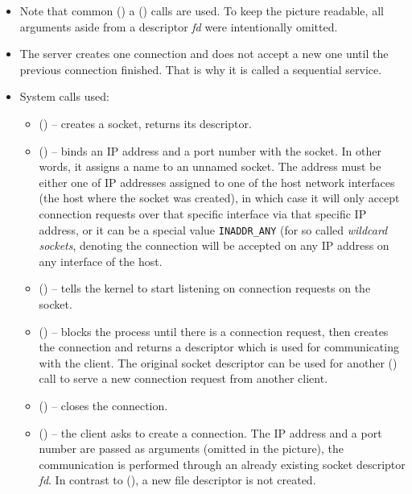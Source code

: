 
\begin{slide}

\end{slide}

\begin{itemize}
\item Note that common () a () calls are used.  To
keep the picture readable, all arguments aside from a descriptor \emph{fd} were
intentionally omitted.
\item The server creates one connection and does not accept a new one until the
previous connection finished.  That is why it is called a sequential service.
\item System calls used:
\begin{itemize}
\item {}() -- creates a socket, returns its descriptor.

\item {}() -- binds an IP address and a port number with the socket.
In other words, it assigns a name to an unnamed socket.  The address must be
either one of IP addresses assigned to one of the host network interfaces (the
host where the socket was created), in which case it will only accept connection
requests over that specific interface via that specific IP address, or it can be
a special value \texttt{INADDR\_ANY} (for so called \emph{wildcard sockets},
denoting the connection will be accepted on any IP address on any interface of
the host.
\item {}() -- tells the kernel to start listening on connection
requests on the socket.
\item {}() -- blocks the process until there is a connection
request, then creates the connection and returns a  descriptor which
is used for communicating with the client.  The original socket descriptor can
be used for another () call to serve a new connection request from
another client.
\item {}() -- closes the connection.
\item {}() -- the client asks to create a connection.  The IP
address and a port number are passed as arguments (omitted in the picture), the
communication is performed through an already existing socket descriptor
\emph{fd}.  In contrast to (), a new file descriptor is not
created.
\end{itemize}
\end{itemize}

